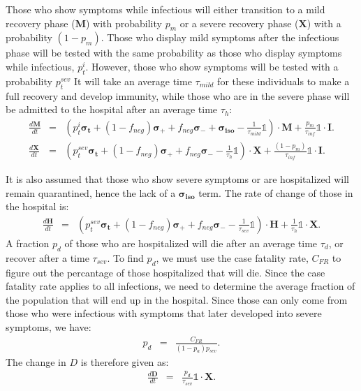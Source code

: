 \documentclass[notitlepage, superscriptaddress]{revtex4-2}
\begin{document}
Those who show symptoms while infectious will either transition to a mild recovery phase ($\boldsymbol{M}$) with probability $p_{m}$ or a severe recovery phase ($\boldsymbol{X}$) with a probability $(1-p_{m})$. Those who display mild symptoms after the infectious phase will be tested with the same probability as those who display symptoms while infectious, $p^{i}_{t}$. However, those who show symptoms will be tested with a probability $p^{sev}_{t}$ It will take an average time $\tau_{mild}$ for these individuals to make a full recovery and develop immunity, while those who are in the severe phase will be admitted to the hospital after an average time $\tau_{h}$:
\begin{eqnarray}
\frac{d \boldsymbol{M}}{dt} &=& \left( p^{i}_{t} \boldsymbol{\sigma_{t}} + (1-f_{neg}) \boldsymbol{\sigma_{+}} + f_{neg} \boldsymbol{\sigma_{-}} + \boldsymbol{\sigma_{iso}} - \frac{1}{\tau_{mild}} \mathbb{1} \right) \cdot \boldsymbol{M} + \frac{p_{m}}{\tau_{inf}} \mathbb{1} \cdot \boldsymbol{I}. \\ 
%
\frac{d \boldsymbol{X}}{dt} &=& \left( p^{sev}_{t} \boldsymbol{\sigma_{t}} + (1-f_{neg}) \boldsymbol{\sigma_{+}} + f_{neg} \boldsymbol{\sigma_{-}} - \frac{1}{\tau_{h}} \mathbb{1} \right) \cdot \boldsymbol{X} + \frac{(1-p_{m})}{\tau_{inf}} \mathbb{1} \cdot \boldsymbol{I}. 
\end{eqnarray}

It is also assumed that those who show severe symptoms or are hospitalized will remain quarantined, hence the lack of a $\boldsymbol{\sigma_{iso}}$ term. The rate of change of those in the hospital is:
\begin{eqnarray}
\frac{d \boldsymbol{H}}{dt} &=& \left( p^{sev}_{t} \boldsymbol{\sigma_{t}} + (1-f_{neg}) \boldsymbol{\sigma_{+}} + f_{neg} \boldsymbol{\sigma_{-}} - \frac{1}{\tau_{sev}} \mathbb{1} \right) \cdot \boldsymbol{H} + \frac{1}{\tau_{h}} \mathbb{1} \cdot \boldsymbol{X}. 
\end{eqnarray}
A fraction $p_{d}$ of those who are hospitalized will die after an average time $\tau_{d}$, or recover after a time $\tau_{sev}$. To find $p_{d}$, we must use the case fatality rate, $C_{FR}$ to figure out the percantage of those hospitalized that will die. Since the case fatality rate applies to all infections, we need to determine the average fraction of the population that will end up in the hospital. Since those can only come from those who were infectious with symptoms that later developed into severe symptoms, we have:
\begin{eqnarray}
p_{d} &=& \frac{C_{FR}}{(1- p_{a}) p_{sev}}.
\end{eqnarray}
The change in $D$ is therefore given as:
\begin{eqnarray}
\frac{d \boldsymbol{D}}{dt} &=& \frac{p_{d}}{\tau_{sev}} \mathbb{1} \cdot \boldsymbol{X}. 
\end{eqnarray}
\end{document}
